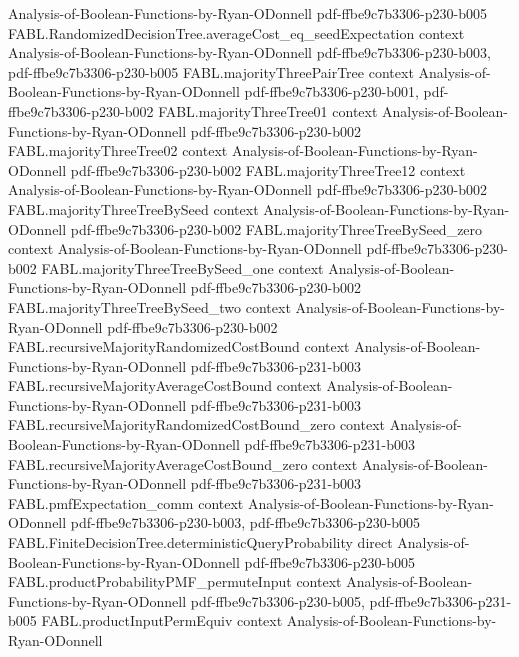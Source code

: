 \begin{theorem}
  {Analysis-of-Boolean-Functions-by-Ryan-ODonnell}
  {pdf-ffbe9c7b3306-p230-b005}
\proofstep
  {FABL.RandomizedDecisionTree.averageCost_eq_seedExpectation}
  {context}
  {Analysis-of-Boolean-Functions-by-Ryan-ODonnell}
  {pdf-ffbe9c7b3306-p230-b003,
    pdf-ffbe9c7b3306-p230-b005}
\proofstep
  {FABL.majorityThreePairTree}
  {context}
  {Analysis-of-Boolean-Functions-by-Ryan-ODonnell}
  {pdf-ffbe9c7b3306-p230-b001,
    pdf-ffbe9c7b3306-p230-b002}
\proofstep
  {FABL.majorityThreeTree01}
  {context}
  {Analysis-of-Boolean-Functions-by-Ryan-ODonnell}
  {pdf-ffbe9c7b3306-p230-b002}
\proofstep
  {FABL.majorityThreeTree02}
  {context}
  {Analysis-of-Boolean-Functions-by-Ryan-ODonnell}
  {pdf-ffbe9c7b3306-p230-b002}
\proofstep
  {FABL.majorityThreeTree12}
  {context}
  {Analysis-of-Boolean-Functions-by-Ryan-ODonnell}
  {pdf-ffbe9c7b3306-p230-b002}
\proofstep
  {FABL.majorityThreeTreeBySeed}
  {context}
  {Analysis-of-Boolean-Functions-by-Ryan-ODonnell}
  {pdf-ffbe9c7b3306-p230-b002}
\proofstep
  {FABL.majorityThreeTreeBySeed_zero}
  {context}
  {Analysis-of-Boolean-Functions-by-Ryan-ODonnell}
  {pdf-ffbe9c7b3306-p230-b002}
\proofstep
  {FABL.majorityThreeTreeBySeed_one}
  {context}
  {Analysis-of-Boolean-Functions-by-Ryan-ODonnell}
  {pdf-ffbe9c7b3306-p230-b002}
\proofstep
  {FABL.majorityThreeTreeBySeed_two}
  {context}
  {Analysis-of-Boolean-Functions-by-Ryan-ODonnell}
  {pdf-ffbe9c7b3306-p230-b002}
\proofstep
  {FABL.recursiveMajorityRandomizedCostBound}
  {context}
  {Analysis-of-Boolean-Functions-by-Ryan-ODonnell}
  {pdf-ffbe9c7b3306-p231-b003}
\proofstep
  {FABL.recursiveMajorityAverageCostBound}
  {context}
  {Analysis-of-Boolean-Functions-by-Ryan-ODonnell}
  {pdf-ffbe9c7b3306-p231-b003}
\proofstep
  {FABL.recursiveMajorityRandomizedCostBound_zero}
  {context}
  {Analysis-of-Boolean-Functions-by-Ryan-ODonnell}
  {pdf-ffbe9c7b3306-p231-b003}
\proofstep
  {FABL.recursiveMajorityAverageCostBound_zero}
  {context}
  {Analysis-of-Boolean-Functions-by-Ryan-ODonnell}
  {pdf-ffbe9c7b3306-p231-b003}
\proofstep
  {FABL.pmfExpectation_comm}
  {context}
  {Analysis-of-Boolean-Functions-by-Ryan-ODonnell}
  {pdf-ffbe9c7b3306-p230-b003,
    pdf-ffbe9c7b3306-p230-b005}
\proofstep
  {FABL.FiniteDecisionTree.deterministicQueryProbability}
  {direct}
  {Analysis-of-Boolean-Functions-by-Ryan-ODonnell}
  {pdf-ffbe9c7b3306-p230-b005}
\proofstep
  {FABL.productProbabilityPMF_permuteInput}
  {context}
  {Analysis-of-Boolean-Functions-by-Ryan-ODonnell}
  {pdf-ffbe9c7b3306-p230-b005,
    pdf-ffbe9c7b3306-p231-b005}
\proofstep
  {FABL.productInputPermEquiv}
  {context}
  {Analysis-of-Boolean-Functions-by-Ryan-ODonnell}

\end{theorem}

